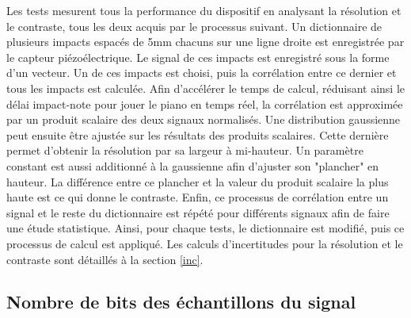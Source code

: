 ﻿\documentclass[11pt,letterpaper]{article}
\begin{document}
Les tests mesurent tous la performance du dispositif en analysant la résolution et le contraste, tous les deux
acquis par le processus suivant. Un dictionnaire de plusieurs impacts espacés de 5mm chacuns sur une ligne droite
est enregistrée par le capteur piézoélectrique. Le signal de ces impacts est enregistré sous la forme d'un vecteur.
Un de ces impacts est choisi, puis la corrélation entre ce dernier et tous les impacts est calculée. Afin d'accélérer
le temps de calcul, réduisant ainsi le délai impact-note pour jouer le piano en temps réel, la corrélation est
approximée par un produit scalaire des deux signaux normalisés. Une distribution gaussienne peut ensuite être
ajustée sur les résultats des produits scalaires. Cette dernière permet d'obtenir la résolution par sa largeur à 
mi-hauteur. Un paramètre constant est aussi additionné à la gaussienne afin d'ajuster son "plancher" en hauteur.
La différence entre ce plancher et la valeur du produit scalaire la plus haute est ce qui donne le contraste. Enfin,
ce processus de corrélation entre un signal et le reste du dictionnaire est répété pour différents signaux afin
de faire une étude statistique.
Ainsi, pour chaque tests, le dictionnaire est modifié, puis ce processus de calcul est appliqué. Les calculs
d'incertitudes pour la résolution et le contraste sont détaillés à la section \ref{inc}.

\subsection{Nombre de bits des échantillons du signal}
\end{document}

